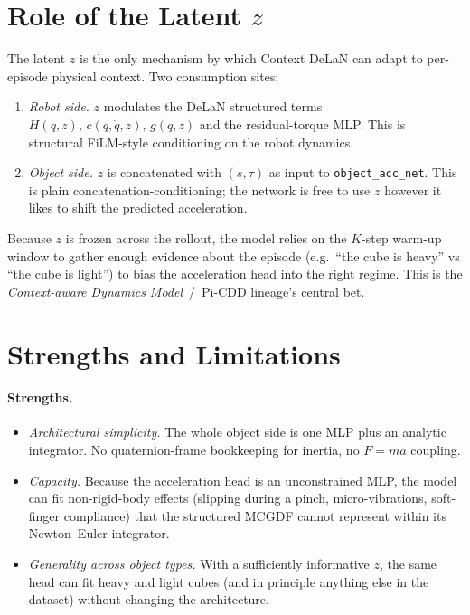 \documentclass[11pt]{article}
\begin{document}
\section{Role of the Latent \texorpdfstring{$z$}{z}}

The latent $z$ is the only mechanism by which Context DeLaN can adapt
to per-episode physical context.  Two consumption sites:
\begin{enumerate}
  \item \emph{Robot side.} $z$ modulates the DeLaN structured terms
    $H(q,z),\,c(q,\dot q,z),\,g(q,z)$ and the residual-torque MLP.
    This is structural FiLM-style conditioning on the robot dynamics.
  \item \emph{Object side.} $z$ is concatenated with $(s,\tau)$ as
    input to \texttt{object\_acc\_net}.  This is plain
    concatenation-conditioning; the network is free to use $z$
    however it likes to shift the predicted acceleration.
\end{enumerate}
Because $z$ is frozen across the rollout, the model relies on the
$K$-step warm-up window to gather enough evidence about the episode
(e.g.\ ``the cube is heavy'' vs ``the cube is light'') to bias the
acceleration head into the right regime.  This is the
\emph{Context-aware Dynamics Model}~/~Pi-CDD lineage's central bet.

\section{Strengths and Limitations}

\paragraph{Strengths.}
\begin{itemize}
  \item \emph{Architectural simplicity.}  The whole object side is
    one MLP plus an analytic integrator.  No quaternion-frame
    bookkeeping for inertia, no $F=ma$ coupling.
  \item \emph{Capacity.}  Because the acceleration head is an
    unconstrained MLP, the model can fit non-rigid-body effects
    (slipping during a pinch, micro-vibrations, soft-finger
    compliance) that the structured MCGDF cannot represent within its
    Newton--Euler integrator.
  \item \emph{Generality across object types.}  With a sufficiently
    informative $z$, the same head can fit heavy and light cubes (and
    in principle anything else in the dataset) without changing the
    architecture.
\end{itemize}
\end{document}
